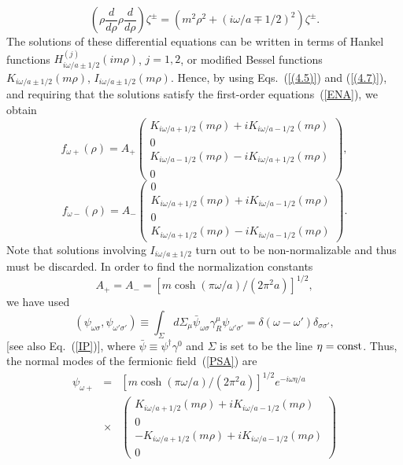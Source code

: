 \documentclass[12pt,nofootinbib,floatfix,aps,prd,showpacs,amsmath,amssymb,eqsecnum]{revtex4-2}
\begin{document}
\begin{equation}
\left( \rho\frac{d}{d\rho}\rho\frac{d}{d\rho} \right) \zeta^\pm 
= 
(m^2\rho^2+(i\omega/a \mp 1/2)^2) \zeta^\pm.
\label{(4.82)}
\end{equation}
The solutions of these differential equations can be written
in terms of Hankel functions 
$ H^{(j)}_{i\omega/a \pm 1/2}(im\rho)$, $j=1,2$,  
or modified Bessel functions 
$ 
K_{i \omega/a \pm 1/2}(m\rho)
$, 
$
I_{i \omega/a \pm 1/2}(m\rho)
$.
Hence, by using Eqs.~(\ref{(4.5)}) and (\ref{(4.7)}), 
and requiring that the solutions  satisfy the 
first-order equations~(\ref{ENA}), we obtain 
$$
f_{\omega +} (\rho) = 
A_+ 
\left(
\begin{array}{c}
   K_{i \omega/a + 1/2}(m\rho) +
   i K_{i \omega/a - 1/2}(m\rho) \\
0 \\
   K_{i \omega/a - 1/2}(m\rho) -
   i K_{i \omega/a + 1/2}(m\rho) \\
0
\end{array}
\right),
$$
$$
f_{\omega -} (\rho) =  
A_- 
\left(
\begin{array}{c}
0\\
   K_{i \omega/a + 1/2}(m\rho) +
   i K_{i \omega/a - 1/2}(m\rho) \\
0\\
   K_{i \omega/a + 1/2}(m\rho) -
   i K_{i \omega/a - 1/2}(m\rho)
\end{array}
\right).
$$
Note that solutions involving $I_{i \omega/a \pm 1/2}$ turn out to be 
non-normalizable and thus must be discarded.
In order to find the normalization constants 
\begin{equation}
A_+=A_-= [{m \cosh (\pi \omega/a)}/{(2\pi^2 a)}]^{1/2},
\label{CONST}
\end{equation} 
we  have used \cite{Birrelletal82} 
\begin{equation}
(
\psi_{\omega \sigma} , \psi_{\omega' \sigma'} 
) 
\equiv 
\int_\Sigma d\Sigma_\mu 
\bar \psi_{\omega \sigma} \gamma^\mu_R 
\psi_{\omega' \sigma'}
=
\delta(\omega-\omega') \delta_{\sigma \sigma'},
\label{IP2}
\end{equation}
[see also Eq.~(\ref{IP})], where 
$\bar \psi \equiv \psi^\dagger \gamma^0$ 
and  $\Sigma$ is set to be the line $\eta={\rm const}$.
Thus, the normal modes of the fermionic field~(\ref{PSA}) are 
\begin{eqnarray}
\psi_{\omega +} 
&=&  
[{m \cosh (\pi \omega/a)}/{(2 \pi^2 a)}]^{1/2}
e^{-i\omega \eta/a}
\nonumber \\
&\times& 
\left(
\begin{array}{c}
K_{i \omega/a + 1/2}(m\rho) +
i K_{i \omega/a - 1/2}(m\rho) \\
0\\
-K_{i \omega/a + 1/2}(m\rho) +
i K_{i \omega/a - 1/2}(m\rho) \\
0
\end{array}
\right)
\nonumber \\
\label{RNM1}
\end{eqnarray}
\end{document}
